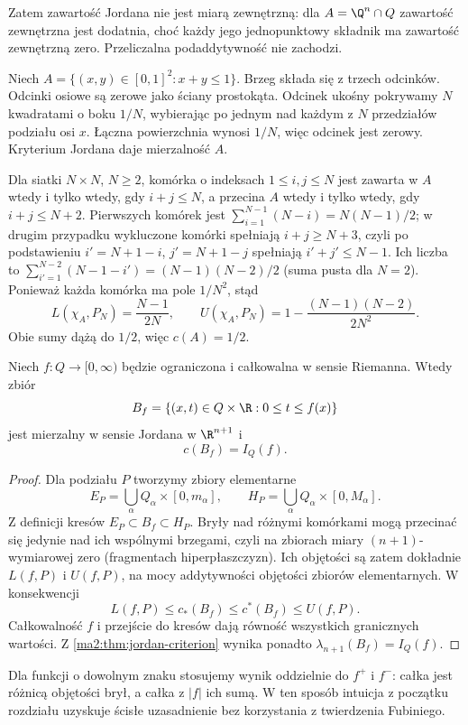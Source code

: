 Zatem zawartość Jordana nie jest miarą zewnętrzną:
dla $A=\Q^n\cap Q$ zawartość zewnętrzna jest dodatnia,
choć każdy jego jednopunktowy składnik ma zawartość
zewnętrzną zero. Przeliczalna podaddytywność
nie zachodzi.

\begin{przyklad}[Trójkąt]
\label{ma2:ex:jordan-triangle}
Niech $A=\{(x,y)\in[0,1]^2:x+y\le1\}$.
Brzeg składa się z trzech odcinków. Odcinki osiowe
są zerowe jako ściany prostokąta. Odcinek ukośny
pokrywamy $N$ kwadratami o boku $1/N$,
wybierając po jednym nad każdym z $N$ przedziałów
podziału osi $x$. Łączna powierzchnia wynosi $1/N$,
więc odcinek jest zerowy.
Kryterium Jordana daje mierzalność $A$.

Dla siatki $N\times N$, $N\ge2$, komórka
o indeksach $1\le i,j\le N$ jest zawarta w $A$
wtedy i tylko wtedy, gdy $i+j\le N$, a przecina
$A$ wtedy i tylko wtedy, gdy $i+j\le N+2$.
Pierwszych komórek jest
$\sum_{i=1}^{N-1}(N-i)=N(N-1)/2$; w drugim
przypadku wykluczone komórki spełniają
$i+j\ge N+3$, czyli po podstawieniu
$i'=N+1-i$, $j'=N+1-j$ spełniają
$i'+j'\le N-1$. Ich liczba to
$\sum_{i'=1}^{N-2}(N-1-i')=(N-1)(N-2)/2$
(suma pusta dla $N=2$). Ponieważ każda
komórka ma pole $1/N^2$, stąd
\[
 L(\chi_A,P_N)=\frac{N-1}{2N},\qquad
 U(\chi_A,P_N)=1-\frac{(N-1)(N-2)}{2N^2}.
\]
Obie sumy dążą do $1/2$, więc $c(A)=1/2$.
\end{przyklad}

\begin{twierdzenie}
\label{ma2:thm:riemann-subgraph-volume}
Niech $f:Q\to[0,\infty)$ będzie ograniczona
i całkowalna w sensie Riemanna.
Wtedy zbiór
\[
 B_f=\{(x,t)\in Q\times\R:0\le t\le f(x)\}
\]
jest mierzalny w sensie Jordana w $\R^{n+1}$
i
\[
 c(B_f)=I_Q(f).
\]
\end{twierdzenie}
\begin{proof}
Dla podziału $P$ tworzymy zbiory elementarne
\[
 E_P=\bigcup_\alpha Q_\alpha\times[0,m_\alpha],
 \qquad
 H_P=\bigcup_\alpha Q_\alpha\times[0,M_\alpha].
\]
Z definicji kresów
$E_P\subset B_f\subset H_P$.
Bryły nad różnymi komórkami mogą przecinać
się jedynie nad ich wspólnymi brzegami,
czyli na zbiorach miary $(n+1)$-wymiarowej
zero (fragmentach hiperpłaszczyzn).
Ich objętości są zatem dokładnie
$L(f,P)$ i $U(f,P)$, na mocy addytywności
objętości zbiorów elementarnych.
W konsekwencji
\[
 L(f,P)\le c_*(B_f)\le c^*(B_f)\le U(f,P).
\]
Całkowalność $f$ i przejście do kresów
dają równość wszystkich granicznych wartości.
Z \ref{ma2:thm:jordan-criterion}
wynika ponadto
$\lambda_{n+1}(B_f)=I_Q(f)$.
\end{proof}
Dla funkcji o dowolnym znaku stosujemy wynik
oddzielnie do $f^+$ i $f^-$:
całka jest różnicą objętości brył, a
całka z $|f|$ ich sumą. W ten sposób
intuicja z początku rozdziału uzyskuje
ścisłe uzasadnienie bez korzystania
z twierdzenia Fubiniego.

